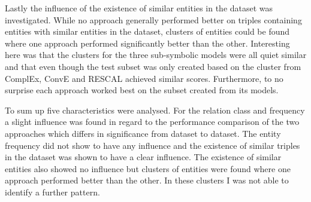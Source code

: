Lastly the influence of the existence of similar entities in the dataset was investigated. While no approach generally performed better on triples containing entities with similar entities in the dataset, clusters of entities could be found where one approach performed significantly better than the other. Interesting here was that the clusters for the three sub-symbolic models were all quiet similar and that even though the test subset was only created based on the cluster from ComplEx, ConvE and RESCAL achieved similar scores. Furthermore, to no surprise each approach worked best on the subset created from its models. 

To sum up five characteristics were analysed. For the relation class and frequency a slight influence was found in regard to the performance comparison of the two approaches which differs in significance from dataset to dataset. The entity frequency did not show to have any influence and the existence of similar triples in the dataset was shown to have a clear influence. The existence of similar entities also showed no influence but clusters of entities were found where one approach performed better than the other. In these clusters I was not able to identify a further pattern. 